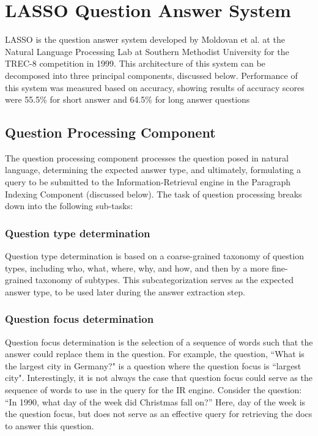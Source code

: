 \section{LASSO Question Answer System}

LASSO \cite{moldovan_1999} is the question answer system developed by Moldovan et al. at the Natural Language Processing Lab at Southern Methodist University for the TREC-8 competition in 1999.  This architecture of this system can be decomposed into three principal components, discussed below.  Performance of this system was measured based on accuracy, showing results of accuracy scores were 55.5\% for short answer and 64.5\% for long answer questions

\subsection{Question Processing Component}

The question processing component processes the question posed in natural language, determining the expected answer type, and ultimately, formulating a query to be submitted to the Information-Retrieval engine in the Paragraph Indexing Component (discussed below).  The task of question processing breaks down into the following sub-tasks:

\subsubsection{Question type determination}

Question type determination is based on a coarse-grained taxonomy of question types, including who, what, where, why, and how, and then by a more fine-grained taxonomy of subtypes.  This subcategorization serves as the expected answer type, to be used later during the answer extraction step.

\subsubsection{Question focus determination}

Question focus determination is the selection of a sequence of words such that the answer could replace them in the question.  For example, the question, ``What is the largest city in Germany?" is a question where the question focus is ``largest city".  Interestingly, it is not always the case that question focus could serve as the sequence of words to use in the query for the IR engine.   Consider the question: ``In 1990, what day of the week did Christmas fall on?”  Here, day of the week is the question focus, but does not serve as an effective query for retrieving the docs to answer this question.  

